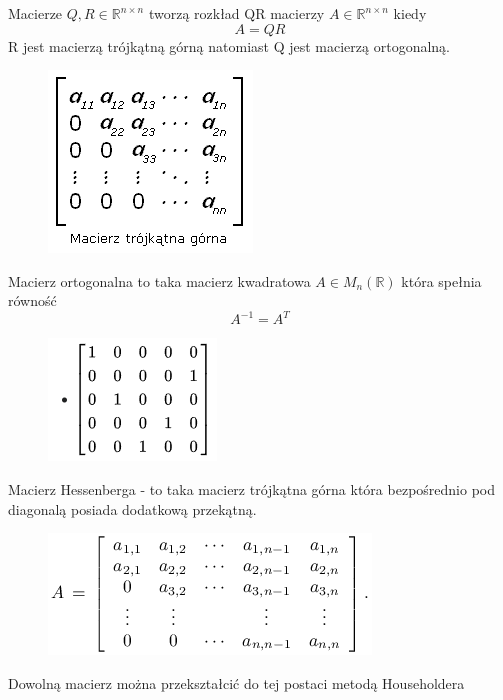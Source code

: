 \documentclass[11pt]{beamer}
\begin{document}
\begin{frame}{\subsecname}
	Macierze $Q, R \in \mathbb{R}^{n\times n}$ tworzą rozkład QR macierzy $ A \in \mathbb{R}^{n\times n}$ kiedy $$A = QR$$
R jest macierzą trójkątną górną natomiast Q jest macierzą ortogonalną.
\begin{figure}[h]
\includegraphics[scale=0.5]{macierz-trojkatna-gorna}
\end{figure}
\end{frame}

\begin{frame}{\subsecname}
Macierz ortogonalna to taka macierz kwadratowa $A \in M_n(\mathbb{R})$ która spełnia równość $$A^{-1} = A^T$$ 
\begin{figure}[h]
\includegraphics[scale=1]{macierz-ortogonalna}
\end{figure}
\end{frame}

\begin{frame}{\subsecname}
Macierz Hessenberga - to taka macierz trójkątna górna która bezpośrednio pod diagonalą posiada dodatkową przekątną.
\begin{figure}[h]
\includegraphics[scale=0.5]{macierz-hessenberga}
\end{figure}
Dowolną macierz można przekształcić do tej postaci metodą Householdera
\end{frame}
\end{document}
